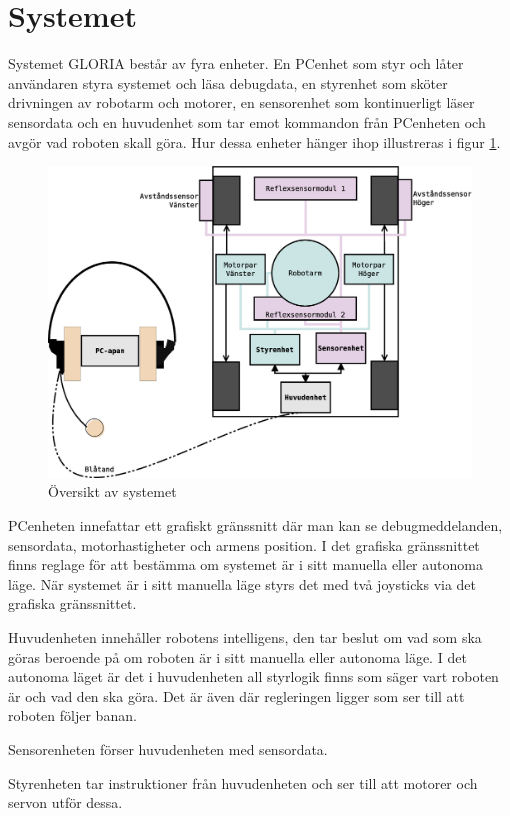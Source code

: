 
\section{Systemet}
Systemet GLORIA består av fyra enheter. En PCenhet som styr och låter användaren styra systemet och läsa debugdata, en styrenhet som sköter drivningen av robotarm och motorer, en sensorenhet som kontinuerligt läser sensordata och en huvudenhet som tar emot kommandon från PCenheten och avgör vad roboten skall göra. Hur dessa enheter hänger ihop illustreras i figur \ref{system-oversikt}.

\begin{figure}[h!]
	\centering
	\includegraphics[scale=0.4]{grafik/system-oversikt}
	\caption{Översikt av systemet} \label{system-oversikt}
\end{figure}

PCenheten innefattar ett grafiskt gränssnitt där man kan se debugmeddelanden, sensordata, motorhastigheter och armens position. I det grafiska gränssnittet finns reglage för att bestämma om systemet är i sitt manuella eller autonoma läge. När systemet är i sitt manuella läge styrs det med två joysticks via det grafiska gränssnittet.

Huvudenheten innehåller robotens intelligens, den tar beslut om vad som ska göras beroende på om roboten är i sitt manuella eller autonoma läge. I det autonoma läget är det i huvudenheten all styrlogik finns som säger vart roboten är och vad den ska göra. Det är även där regleringen ligger som ser till att roboten följer banan.

Sensorenheten förser huvudenheten med sensordata.

Styrenheten tar instruktioner från huvudenheten och ser till att motorer och servon utför dessa.

